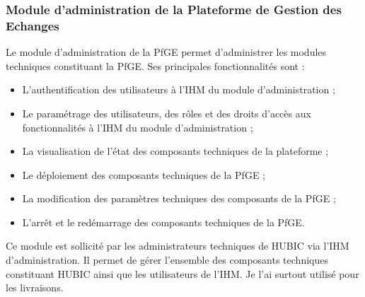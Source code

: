 \subsubsection{Module d'administration de la Plateforme de Gestion des Echanges}
Le module d'administration de la PfGE permet d'administrer les modules techniques constituant
la PfGE. Ses principales fonctionnalités sont :
\begin{itemize}
	\item L'authentification des utilisateurs à l'IHM du module d'administration ;
	\item Le paramétrage des utilisateurs, des rôles et des droits d'accès aux fonctionnalités à l'IHM
	du module d'administration ;
	\item La visualisation de l'état des composants techniques de la plateforme ;
	\item Le déploiement des composants techniques de la PfGE ;
	\item La modification des paramètres techniques des composants de la PfGE ;
	\item L'arrêt et le redémarrage des composants techniques de la PfGE.
\end{itemize}
Ce module est sollicité par les administrateurs techniques de HUBIC via l'IHM d'administration.
Il permet de gérer l'ensemble des composants techniques constituant HUBIC ainsi que les
utilisateurs de l'IHM. Je l'ai surtout utilisé pour les livraisons.
